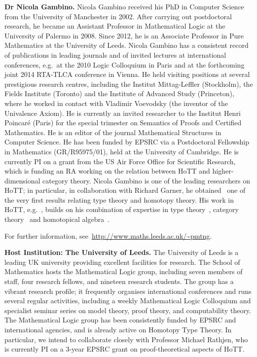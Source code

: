 \documentclass[a4paper,11pt]{article}
\newcommand{\eg}{{e.g.}\ }
\begin{document}
\textbf{Dr Nicola Gambino.} Nicola Gambino received his PhD in
Computer Science from the University of Manchester in 2002. After
carrying out postdoctoral research, he became an Assistant Professor
in Mathematical Logic at the University of Palermo in 2008. Since
 2012, he is an Associate Professor in Pure Mathematics at
the University of Leeds. Nicola Gambino has a consistent record of
publications in leading journals and of invited lectures at
international conferences, {e.g.}~at the 2010 Logic Colloquium in Paris
and at the forthcoming joint 2014 RTA-TLCA conference in Vienna. He
held visiting positions at several prestigious research centres,
including the Institut Mittag-Leffler (Stockholm), the
Fields Institute (Toronto) and the Institute of Advanced Study
(Princeton), where he worked in contact with Vladimir Voevodsky (the inventor of 
the Univalence Axiom).  He is currently an invited researcher to the
Institut Henri Poincar\'e (Paris) for the special trimester on
Semantics of Proofs and Certified Mathematics.  He is an editor of the
journal Mathematical Structures in Computer Science. He has been funded by 
EPSRC via a Postdoctoral Fellowship in Mathematics (GR/R95975/01),
held at the University of Cambridge. He is currently PI on a grant from 
the US Air Force Office for Scientific
Research, which is funding an RA working on the relation between HoTT and
higher-dimensional category theory. 
Nicola Gambino is one of the leading researchers on HoTT; in particular,
in collaboration with Richard Garner, he obtained~\cite{gambinoGarner:ITwfs}
one of the very first results relating type theory and homotopy theory.
His work in HoTT, \eg \cite{awodeyGamSoja:indTypesInHTT}, builds on his
combination of expertise in type theory~\cite{GambinoN:gentti}, category 
theory~\cite{gambinoHyland:welfoundedTrees,GambinoN:polfpm} and
homotopical algebra~\cite{GambinoN:homl2c,GambinoN:weilsh}.




For further information,  see~\url{http://www.maths.leeds.ac.uk/~pmtng}.

\textbf{Host Institution: The University of Leeds.} The University of
Leeds is a leading UK university providing
excellent facilities for research. The School of Mathematics hosts the
Mathematical Logic group, including seven members of staff, four
research fellows, and nineteen research students. The group has a
vibrant research profile; it frequently organises
international conferences and runs several regular activities,
including a weekly Mathematical Logic Colloquium and specialist
seminar series on model theory, proof theory, and computability
theory. The Mathematical Logic group has been consistently funded by
EPSRC and international agencies, and is already active on Homotopy
Type Theory. In particular, we intend to collaborate closely with
Professor Michael Rathjen, who is currently PI
on a 3-year EPSRC grant on proof-theoretical aspects of HoTT. 
\end{document}
